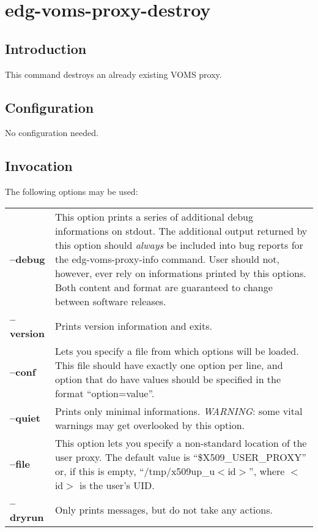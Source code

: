 \documentclass[a4paper]{book}
\begin{document}
\chapter{edg-voms-proxy-destroy}
\section{Introduction}
This command destroys an already existing VOMS proxy.

\section{Configuration}
No configuration needed.

\section{Invocation}
The following options may be used:

\begin{longtable}{lp{3in}}
\textbf{--debug}    & This option prints a series of additional debug
		      informations on stdout.  The additional output
		      returned by this option should \emph{always} be
		      included into bug reports for the
		      edg-voms-proxy-info command.  User should not,
		      however, ever rely on informations printed by
		      this options.  Both content and format are
		      guaranteed to change between software
		      releases.\\
\textbf{--version}  & Prints version information and exits.\\
\textbf{--conf}     & Lets you specify a file from which options will
		      be loaded.  This file should have exactly one
		      option per line, and option that do have values
		      should be specified in the format
		      ``option=value''.\\ 
\textbf{--quiet}    & Prints only minimal informations.
		      \emph{WARNING}: some vital warnings may get
		      overlooked by this option.\\
\textbf{--file}     & This option lets you specify a non-standard
		      location of the user proxy.  The default value
		      is ``\$X509\_USER\_PROXY'' or, if this is empty,
		      ``/tmp/x509up\_u$<$id$>$'', where $<$id$>$ is
		      the user's UID.\\
\textbf{--dryrun}   & Only prints messages, but do not take any
		      actions.\\
\end{longtable}
\end{document}
